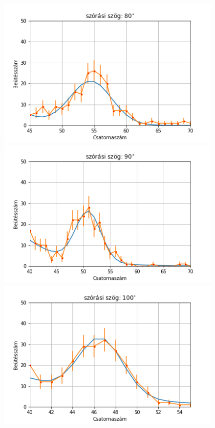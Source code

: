 \documentclass[a4paper,12pt]{article}
\begin{document}
\begin{figure}[!htb]
\begin{minipage}{.49\textwidth}
    \end{minipage}%
    \begin{minipage}{.49\textwidth}
        \centering
        \includegraphics[width=1.\linewidth]{../plots/withbackground/80_1100fit.png}
    \end{minipage}
    \begin{minipage}{.49\textwidth}
        \centering
        \includegraphics[width=1.\linewidth]{../plots/withbackground/90_977fit.png}
    \end{minipage}
    \begin{minipage}{.49\textwidth}
        \centering
        \includegraphics[width=1.\linewidth]{../plots/withbackground/100_1113fit.png}

\end{minipage}
\end{figure}
\end{document}
